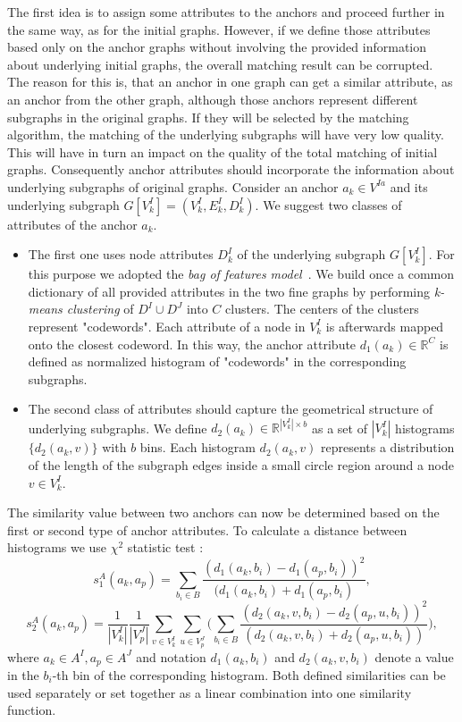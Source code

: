 The first idea is to assign some attributes to the anchors and proceed further in the same way, as for the initial graphs. However, if we define those attributes based only on the anchor graphs without involving the provided information about underlying initial graphs, the overall matching result can be corrupted. The reason for this is, that an anchor in one graph can get a similar attribute, as an anchor from the other graph, although those anchors represent different subgraphs in the original graphs. If they will be selected by the matching algorithm, the matching of the underlying subgraphs will have very low quality. This will have in turn an impact on the quality of the total matching of initial graphs. Consequently anchor attributes should incorporate the information about underlying subgraphs of original graphs.
Consider an anchor $a_k\in V^{Ia}$ and its underlying subgraph $G[V^I_k]=(V^I_k,E^I_k,D^I_k)$. We suggest two classes of attributes of the anchor $a_k$. 
\begin{itemize}
\item The first one uses node attributes $D^I_k$ of the underlying subgraph $G[V^I_k]$. For this purpose we adopted the \emph{bag of features model}~\cite{BoF_Leung2001}. We build once a common dictionary of all provided attributes in the two fine graphs by performing \emph{k-means clustering} of $D^I\cup D^J$ into $C$ clusters. The centers of the clusters represent "codewords". Each attribute of a node in $V^I_k$ is afterwards mapped onto the closest codeword. In this way, the anchor attribute $d_1(a_k)\in\mathbb{R}^C$ is defined as normalized histogram of "codewords" in the corresponding subgraphs.

\item The second class of attributes should capture the geometrical structure of underlying subgraphs. We define $d_2(a_k)\in\mathbb{R}^{|V^I_k|\times b}$ as a set of $|V^I_k|$ histograms $\{d_2(a_k,v)\}$ with $b$ bins. Each histogram $d_2(a_k,v)$ represents a distribution of the length of the subgraph edges inside a small circle region around a node $v\in V^I_k$. 
\end{itemize}
The similarity value between two anchors can now be determined based on the first or second type of anchor attributes. To calculate a distance between histograms we use $\chi^2$ statistic test \cite{Weken2004_ChiSqTest}:
\begin{equation}
s^A_1(a_k, a_p) = \sum_{b_i\in B}\frac{(d_1(a_k,b_i)-d_1(a_p,b_i))^2}{(d_1(a_k,b_i)+d_1(a_p,b_i)},
\end{equation}
\begin{equation}
s^A_2(a_k, a_p) = \frac{1}{|V^I_k|}\frac{1}{|V^J_p|}\sum_{v\in V^I_k}\sum_{u\in V^J_p} \big(\sum_{b_i\in B}\frac{(d_2(a_k,v,b_i)-d_2(a_p,u,b_i))^2}{(d_2(a_k,v,b_i)+d_2(a_p,u,b_i))}\big),
\end{equation}
where $a_k\in A^I, a_p\in A^J$ and notation $d_1(a_k,b_i)$ and $d_2(a_k,v,b_i)$ denote a value in the $b_i$-th bin of the corresponding histogram. 
Both defined similarities can be used separately or set together as a linear combination into one similarity function.

